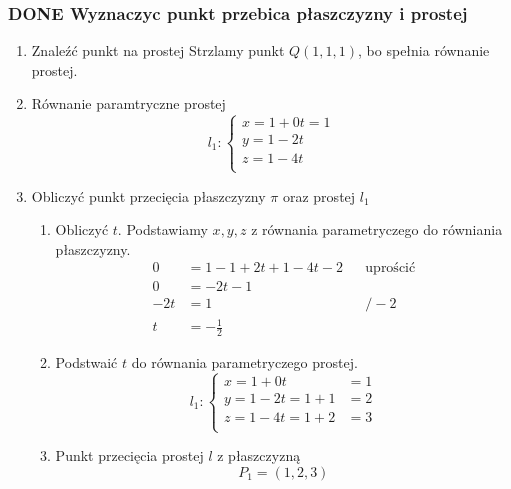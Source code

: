 \documentclass[11pt]{article}
\begin{document}
\subsubsection{{\bfseries\sffamily DONE} Wyznaczyc punkt przebica płaszczyzny i prostej}
\label{sec:org3ff75c4}
\begin{enumerate}
\item Znaleźć punkt na prostej
\label{sec:org06511dd}
Strzlamy punkt \(Q(1,1,1)\), bo spełnia równanie prostej.
\item Równanie paramtryczne prostej
\label{sec:org118fddc}
\[l_1 : \begin{cases}
        x = 1 + 0t = 1\\
        y = 1 - 2t \\
        z = 1 - 4t\\
\end{cases}\]
\item Obliczyć punkt przecięcia płaszczyzny \(\pi\) oraz prostej \(l_1\)
\label{sec:org8ac9e81}
\begin{enumerate}
\item Obliczyć \(t\).
\label{sec:orgd9e663a}
Podstawiamy \(x, y, z\) z równania parametryczego do równiania płaszczyzny.
\begin{align*}
  0 &= 1 - 1 + 2t + 1 - 4t -2 && \text{uprościć}
  \\
  0 &= -2t -1
  \\
  -2t &= 1 && / -2
  \\
  t &= - \frac{1}{2}
\end{align*}
\item Podstwaić \(t\) do równania parametryczego prostej.
\label{sec:orgfe144d5}
\[l_1 : \begin{cases}
        x = 1 + 0t &= 1\\
        y = 1 - 2t = 1 + 1 &= 2 \\
        z = 1 - 4t = 1 + 2 &= 3\\
\end{cases}\]
\item Punkt przecięcia prostej \(l\) z płaszczyzną
\label{sec:org686f8d8}
\[P_1 = (1, 2, 3)\]
\end{enumerate}
\end{enumerate}
\end{document}
